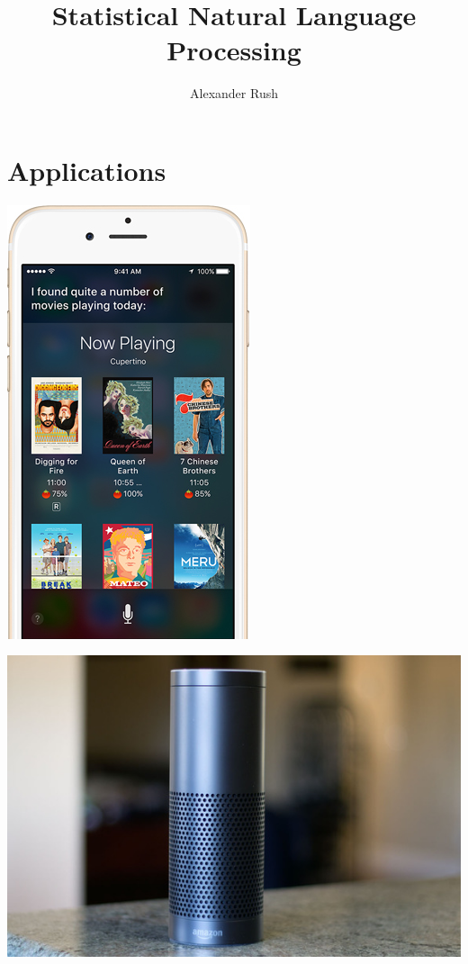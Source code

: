 \documentclass{beamer}
\title{Statistical Natural Language Processing}
\author{Alexander Rush}
\newenvironment{changemargin}{%
\begin{list}{}{%
\vspace{-1cm}
\setlength{\topsep}{0pt}%
\setlength{\leftmargin}{-1cm}%
\setlength{\rightmargin}{-1cm}%
\setlength{\listparindent}{\parindent}%
\setlength{\itemindent}{\parindent}%
\setlength{\parsep}{\parskip}%
}%
\item[]}{\end{list}}
\begin{document}
\begin{frame}
  \titlepage
\end{frame}

\section{Applications}

{

}

\begin{frame}
  \begin{center}
    \includegraphics{siri}
  \end{center}
\end{frame}

\begin{frame}
  \begin{changemargin}
  \begin{center}
    \includegraphics[height=1.1\textheight]{echo}
  \end{center}
  \end{changemargin}
\end{frame}
\end{document}
